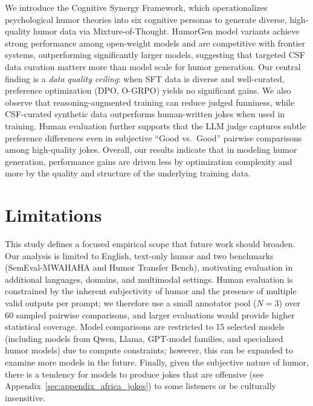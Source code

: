 \documentclass[11pt]{article}
\begin{document}
We introduce the Cognitive Synergy Framework, which operationalizes psychological humor theories into six cognitive personas to generate diverse, high-quality humor data via Mixture-of-Thought. HumorGen model variants achieve strong performance among open-weight models and are competitive with frontier systems, outperforming significantly larger models, suggesting that targeted CSF data curation matters more than model scale for humor generation. Our central finding is a \textit{data quality ceiling}: when SFT data is diverse and well-curated, preference optimization (DPO, O-GRPO) yields no significant gains. We also observe that reasoning-augmented training can reduce judged funniness, while CSF-curated synthetic data outperforms human-written jokes when used in training. Human evaluation further supports that the LLM judge captures subtle preference differences even in subjective ``Good vs.\ Good'' pairwise comparisons among high-quality jokes. Overall, our results indicate that in modeling humor generation, performance gains are driven less by optimization complexity and more by the quality and structure of the underlying training data.





\section{Limitations}
This study defines a focused empirical scope that future work should broaden. Our analysis is limited to English, text-only humor and two benchmarks (SemEval-MWAHAHA and Humor Transfer Bench), motivating evaluation in additional languages, domains, and multimodal settings. Human evaluation is constrained by the inherent subjectivity of humor and the presence of multiple valid outputs per prompt; we therefore use a small annotator pool ($N=3$) over 60 sampled pairwise comparisons, and larger evaluations would provide higher statistical coverage. Model comparisons are restricted to 15 selected models (including models from Qwen, Llama, GPT-model families, and specialized humor models) due to compute constraints; however, this can be expanded to examine more models in the future. Finally, given the subjective nature of humor, there is a tendency for models to produce jokes that are offensive (see Appendix~\ref{sec:appendix_africa_jokes}) to some listeners or be culturally insensitive.
\end{document}
